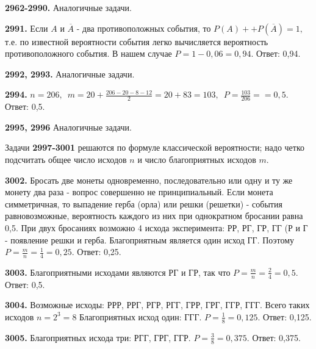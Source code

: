 \textbf{2962-2990.} Аналогичные задачи.

\textbf{2991.} Если $A$ и $\overline{A}$ - два противоположных события, то $P(A)+$\newline$+P(\overline{A})=1,$ т.е. по известной вероятности события легко вычисляется вероятность противоположного события. В нашем случае $P = 1 - 0,06 = 0,94.$ \null \hspace*{\fill} Ответ: 0,94. 

\textbf{2992, 2993.} Аналогичные задачи.

\textbf{2994.} $n=206,\enspace m=20+\frac{206-20-8-12}{2}=20+83=103,\enspace P=\frac{103}{206}=$\newline$=0,5.$ \newline \null \hspace*{\fill} Ответ: 0,5. 

\textbf{2995, 2996} Аналогичные задачи.

Задачи \textbf{2997-3001} решаются по формуле классической вероятности; надо четко подсчитать общее число исходов $n$ и число благоприятных исходов $m$.

\textbf{3002.} Бросать две монеты одновременно, последовательно или одну и ту же монету два раза - вопрос совершенно не принципиальный. Если монета симметричная, то выпадение герба (орла) или решки (решетки) - события равновозможные, вероятность каждого из них при однократном бросании равна 0,5. При двух бросаниях возможно 4 исхода эксперимента: РР, РГ, ГР, ГГ (Р и Г -  появление решки и герба. Благоприятным является один исход ГГ. Поэтому $P = \frac{m}{n}=\frac{1}{4}=0,25.$ \newline \null \hspace*{\fill} Ответ: 0,25. 

\textbf{3003.} Благоприятными исходами являются РГ и ГР, так что $P = \frac{m}{n} =\frac{2}{4} = 0,5.$ \newline \null \hspace*{\fill} Ответ: 0,5. 

\textbf{3004.} Возможные исходы: РРР, РРГ, РГР, РГГ, ГРР, ГРГ, ГГР, ГГГ. Всего таких исходов $n=2^3=8$ Благоприятных исход один: ГГГ. $P = \frac{1}{8} = 0,125.$ \newline \null \hspace*{\fill} Ответ: 0,125. 

\textbf{3005.} Благоприятных исхода три: РГГ, ГРГ, ГГР. $P=\frac{3}{8}=0,375.$ \newline \null \hspace*{\fill} Ответ: 0,375. 

